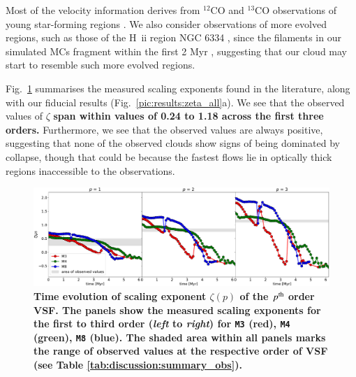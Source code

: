 

Most of the velocity information derives from $^{12}$CO and $^{13}$CO observations of young star-forming regions \citep[e.g., Perseus and Taurus][]{Padoan2003}.
We also consider observations of more evolved regions, such as those of the H~{\sc ii} region NGC 6334 \citep{Zernickel2015}, since the filaments in our simulated MCs fragment within the first 2 Myr , suggesting that our cloud may start to resemble such more evolved regions.

Fig.~\ref{pic:discussion:comp_observation} summarises the measured scaling exponents found in the literature, along with our fiducial results (Fig.~\ref{pic:results:zeta_all}a).
We see that the observed values of $\zeta$ \textbf{span within values of 0.24 to 1.18 across the first three orders.} 
Furthermore, we see that the observed values are always positive, suggesting that none of the observed clouds show signs of being dominated by collapse, though that could be because the fastest flows lie in optically thick regions inaccessible to the observations.  

\begin{figure}
	\includegraphics[width=\textwidth]{pics/compare_observations.pdf}
	\caption{
	\textbf{
	Time evolution of scaling exponent $\zeta(p)$ of the $p^{\rm th}$ order VSF. 
	The panels show the measured scaling exponents for the first to third order (\textit{left} to \textit{right}) for \texttt{M3} (red), \texttt{M4} (green), \texttt{M8} (blue). 
	The shaded area within all panels marks the range of observed values at the respective order of VSF (see Table \ref{tab:discussion:summary_obs}).
	}
	}
	\label{pic:discussion:comp_observation}
\end{figure}


